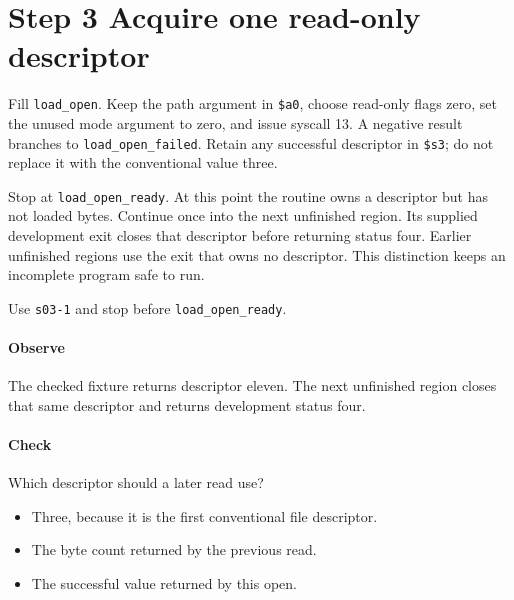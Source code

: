 \section{Step 3 Acquire one read-only descriptor}\label{png-load-s03}
Fill \texttt{load\_open}. Keep the path argument in \texttt{\$a0}, choose read-only flags zero, set the unused mode argument to zero, and issue syscall 13. A negative result branches to \texttt{load\_open\_failed}. Retain any successful descriptor in \texttt{\$s3}; do not replace it with the conventional value three.

Stop at \texttt{load\_open\_ready}. At this point the routine owns a descriptor but has not loaded bytes. Continue once into the next unfinished region. Its supplied development exit closes that descriptor before returning status four. Earlier unfinished regions use the exit that owns no descriptor. This distinction keeps an incomplete program safe to run.

Use \texttt{s03-1} and stop before \texttt{load\_open\_ready}.

\paragraph{Observe} The checked fixture returns descriptor eleven. The next unfinished region closes that same descriptor and returns development status four.

\paragraph{Check} Which descriptor should a later read use?
\begin{itemize}
  \item[A.] Three, because it is the first conventional file descriptor.
  \item[B.] The byte count returned by the previous read.
  \item[C.] The successful value returned by this open.
\end{itemize}

